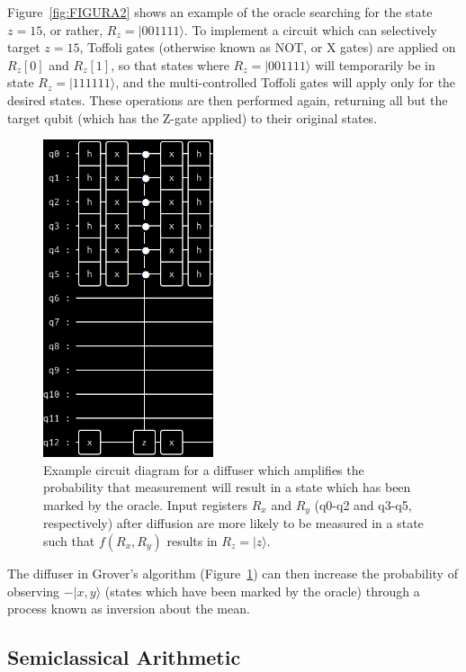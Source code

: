 \documentclass[twocolumn]{cinc}
\begin{document}
  Figure~\ref{fig:FIGURA2} shows an example of the oracle searching for the state $z=15$,
  or rather, $R_z=|001111\rangle$. To implement a circuit which can selectively target
  $z=15$, Toffoli gates (otherwise known as NOT, or X gates) are applied on 
  $R_z[0]$ and $R_z[1]$, so that states where $R_z=|001111\rangle$ will temporarily be in
  state $R_z=|111111\rangle$, and the multi-controlled Toffoli gates\cite{multi_toffoli}
  will apply only for the desired states. These operations are then performed again,
  returning all but the target qubit (which has the Z-gate applied) to their original
  states.

  \begin{figure}[h]\label{fig:FIGURA3}
  \centering
  \includegraphics[width=5.0cm]{diffuse.png}
  \caption{Example circuit diagram for a diffuser which amplifies the probability that
  measurement will result in a state which has been marked by the oracle.
  Input registers $R_x$ and $R_y$ (q0-q2 and q3-q5, respectively) after diffusion are 
  more likely to be measured in a state such that $f(R_x,R_y)$ results in $R_z=|z\rangle$.}
  \end{figure}

  The diffuser in Grover's algorithm (Figure~\ref{fig:FIGURA3}) can then increase the 
  probability of observing $-|x,y\rangle$ (states which have been marked by the oracle) 
  through a process known as inversion about the mean.

  \subsection{Semiclassical Arithmetic} 
\end{document}
